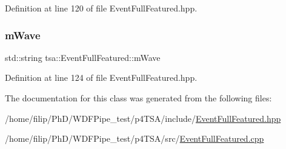 Definition at line 120 of file Event\+Full\+Featured.\+hpp.

\mbox{\label{classtsa_1_1_event_full_featured_ac7d44616083f5a5b2a403986b0c7bf6c}} 
\subsubsection{\texorpdfstring{m\+Wave}{mWave}}
{\footnotesize\ttfamily std\+::string tsa\+::\+Event\+Full\+Featured\+::m\+Wave}



Definition at line 124 of file Event\+Full\+Featured.\+hpp.



The documentation for this class was generated from the following files\+:\begin{DoxyCompactItemize}
\item 
/home/filip/\+Ph\+D/\+W\+D\+F\+Pipe\+\_\+test/p4\+T\+S\+A/include/\hyperlink{_event_full_featured_8hpp}{Event\+Full\+Featured.\+hpp}\item 
/home/filip/\+Ph\+D/\+W\+D\+F\+Pipe\+\_\+test/p4\+T\+S\+A/src/\hyperlink{_event_full_featured_8cpp}{Event\+Full\+Featured.\+cpp}\end{DoxyCompactItemize}
